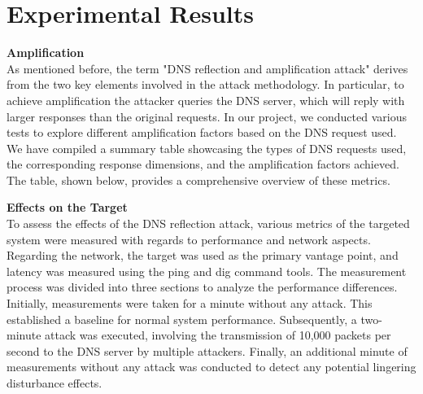 \section{Experimental Results}
\noindent \textbf{Amplification}\\
As mentioned before, the term "DNS reflection and amplification attack" derives from the two key elements involved in the attack methodology. In particular, to achieve amplification the attacker queries the DNS server, which will reply with larger responses than the original requests. In our project, we conducted various tests to explore different amplification factors based on the DNS request used.\\
We have compiled a summary table showcasing the types of DNS requests used, the corresponding response dimensions, and the amplification factors achieved. The table, shown below, provides a comprehensive overview of these metrics.
\begin{table}[H]
    \centering
    \label{tab:dns-amplification}
\end{table}
\noindent \textbf{Effects on the Target}\\
To assess the effects of the DNS reflection attack, various metrics of the targeted system were measured with regards to performance and network aspects. Regarding the network, the target was used as the primary vantage point, and latency was measured using the ping and dig command tools. The measurement process was divided into three sections to analyze the performance differences. Initially, measurements were taken for a minute without any attack. This established a baseline for normal system performance. Subsequently, a two-minute attack was executed, involving the transmission of 10,000 packets per second to the DNS server by multiple attackers. Finally, an additional minute of measurements without any attack was conducted to detect any potential lingering disturbance effects.\\
